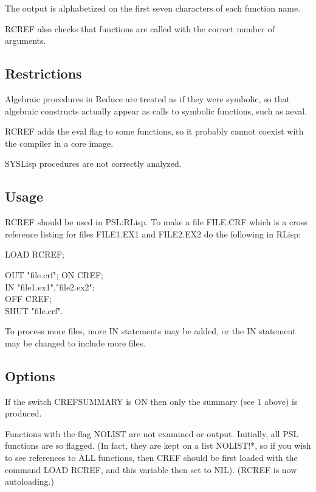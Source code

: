    The  output  is alphabetized on the first seven characters of
each function name.

   RCREF   also  checks  that  functions  are  called  with  the
correct number of arguments.

\subsection{Restrictions}

  Algebraic  procedures  in   Reduce  are  treated  as  if  they
were symbolic,  so that algebraic constructs  actually appear as
calls to symbolic functions, such as aeval.

  RCREF adds the eval flag to some  functions,  so  it  probably
cannot coexist with the compiler in a core image.

  SYSLisp procedures are not correctly analyzed.

\subsection{Usage}

  RCREF  should  be  used in PSL:RLisp.  To make a file FILE.CRF
which is a cross  reference  listing  for  files  FILE1.EX1  and
FILE2.EX2  do the following in RLisp:

LOAD RCREF;       %

OUT "file.crf";   %
ON CREF; \\
IN "file1.ex1","file2.ex2"; \\
OFF CREF; \\
   SHUT "file.crf".  %

To  process  more files, more IN statements may be added, or the
IN statement may be changed to include more files.

\subsection{Options}


{    If the switch CREFSUMMARY is ON then only the summary (see 1
    above) is produced.}

  Functions with the flag NOLIST are  not  examined  or  output.
Initially, all PSL functions are so flagged.  (In fact, they are
kept on a list NOLIST!*, so if you wish to see references to ALL
functions,  then  CREF  should  be first loaded with the command
LOAD RCREF, and this variable then set to NIL).  (RCREF  is  now
autoloading.)

